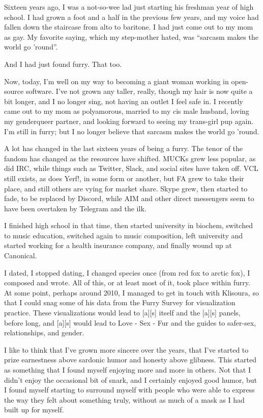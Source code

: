 
Sixteen years ago, I was a not-so-wee lad just starting his freshman year of high school. I had grown a foot and a half in the previous few years, and my voice had fallen down the staircase from alto to baritone. I had just come out to my mom as gay. My favorite saying, which my step-mother hated, was ``sarcasm makes the world go 'round''.

And I had just found furry. That too.

Now, today, I'm well on my way to becoming a giant woman working in open-source software. I've not grown any taller, really, though my hair is now quite a bit longer, and I no longer sing, not having an outlet I feel safe in. I recently came out to my mom as polyamorous, married to my cis male husband, loving my genderqueer partner, and looking forward to seeing my trans-girl pup again. I'm still in furry; but I no longer believe that sarcasm makes the world go 'round.

A lot has changed in the last sixteen years of being a furry. The tenor of the fandom has changed as the resources have shifted. MUCKs grew less popular, as did IRC, while things such as Twitter, Slack, and social sites have taken off. VCL still exists, as does Yerf!, in some form or another, but FA grew to take their place, and still others are vying for market share. Skype grew, then started to fade, to be replaced by Discord, while AIM and other direct messengers seem to have been overtaken by Telegram and the ilk.

I finished high school in that time, then started university in biochem, switched to music education, switched again to music composition, left university and started working for a health insurance company, and finally wound up at Canonical.

I dated, I stopped dating, I changed species once (from red fox to arctic fox), I composed and wrote. All of this, or at least most of it, took place within furry. At some point, perhaps around 2010, I managed to get in touch with Klisoura, so that I could snag some of his data from the Furry Survey for visualization practice. These visualizations would lead to {[}a{]}{[}s{]} itself and the {[}a{]}{[}s{]} panels, before long, and {[}a{]}{[}s{]} would lead to Love - Sex - Fur and the guides to safer-sex, relationships, and gender.

I like to think that I've grown more sincere over the years, that I've started to prize earnestness above sardonic humor and honesty above glibness. This started as something that I found myself enjoying more and more in others. Not that I didn't enjoy the occasional bit of snark, and I certainly enjoyed good humor, but I found myself starting to surround myself with people who were able to express the way they felt about something truly, without as much of a mask as I had built up for myself.

